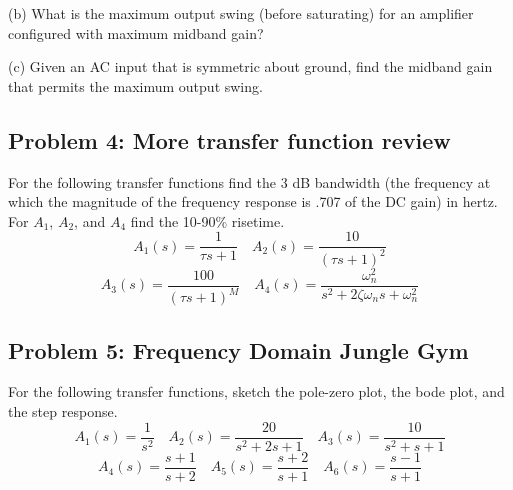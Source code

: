 \documentclass[11pt,twoside]{article}
\begin{document}
	\item[(b)] What is the maximum output swing (before saturating) for an amplifier configured with maximum midband gain?
	\item[(c)] Given an AC input that is symmetric about ground, find the midband gain that permits the maximum output swing.


\subsection*{Problem 4: More transfer function review}
	For the following transfer functions find the 3 dB bandwidth (the frequency at which the magnitude of the frequency response is .707 of the DC gain) in hertz.  For $A_1$, $A_2$, and $A_4$ find the 10-90\% risetime.\\
\begin{equation*}
 A_1(s) = \frac{1}{\tau s+1} \quad A_2(s)= \frac{10}{(\tau s+1)^2} 
\end{equation*}
\begin{equation*}
 A_3(s) = \frac{100}{(\tau s+1)^M} \quad A_4(s)= \frac{\omega_n^2}{s^2+2\zeta\omega_n s+\omega_n^2} 
\end{equation*}

\subsection*{Problem 5: Frequency Domain Jungle Gym}
	For the following transfer functions, sketch the pole-zero plot, the bode plot, and the step response.
\begin{equation*}
 A_1(s) = \frac{1}{s^2} \quad A_2(s) = \frac{20}{s^2+2s+1} \quad A_3(s) = \frac{10}{s^2+s+1}
\end{equation*}
\begin{equation*}
 A_4(s) = \frac{s+1}{s+2} \quad A_5(s) =  \frac{s+2}{s+1} \quad A_6(s) = \frac{s-1}{s+1}
\end{equation*}
\end{document}
